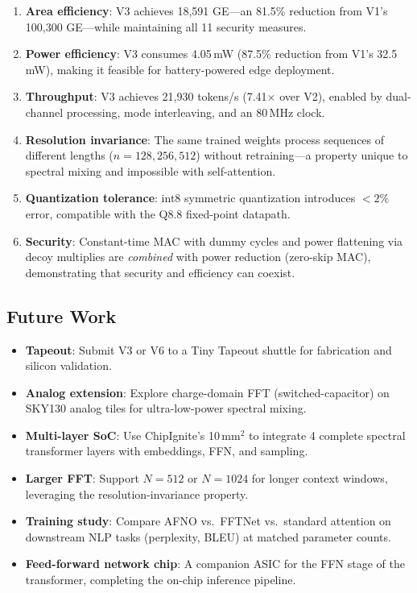 \documentclass[11pt,a4paper]{article}
\theoremstyle{definition}
\theoremstyle{remark}
\begin{document}
\begin{enumerate}
  \item \textbf{Area efficiency}: V3 achieves 18{,}591 GE---an 81.5\% reduction
    from V1's 100{,}300 GE---while maintaining all 11 security measures.
  \item \textbf{Power efficiency}: V3 consumes 4.05\,mW (87.5\% reduction from
    V1's 32.5\,mW), making it feasible for battery-powered edge deployment.
  \item \textbf{Throughput}: V3 achieves 21{,}930 tokens/s (7.41$\times$ over V2),
    enabled by dual-channel processing, mode interleaving, and an 80\,MHz clock.
  \item \textbf{Resolution invariance}: The same trained weights process
    sequences of different lengths ($n=128, 256, 512$) without retraining---a
    property unique to spectral mixing and impossible with self-attention.
  \item \textbf{Quantization tolerance}: int8 symmetric quantization introduces
    $<2\%$ error, compatible with the Q8.8 fixed-point datapath.
  \item \textbf{Security}: Constant-time MAC with dummy cycles and power
    flattening via decoy multiplies are \emph{combined} with power reduction
    (zero-skip MAC), demonstrating that security and efficiency can coexist.
\end{enumerate}

\subsection{Future Work}

\begin{itemize}
  \item \textbf{Tapeout}: Submit V3 or V6 to a Tiny Tapeout shuttle for
    fabrication and silicon validation.
  \item \textbf{Analog extension}: Explore charge-domain FFT (switched-capacitor)
    on SKY130 analog tiles for ultra-low-power spectral mixing.
  \item \textbf{Multi-layer SoC}: Use ChipIgnite's 10\,mm$^2$ to integrate
    4 complete spectral transformer layers with embeddings, FFN, and sampling.
  \item \textbf{Larger FFT}: Support $N=512$ or $N=1024$ for longer context
    windows, leveraging the resolution-invariance property.
  \item \textbf{Training study}: Compare AFNO vs.\ FFTNet vs.\ standard attention
    on downstream NLP tasks (perplexity, BLEU) at matched parameter counts.
  \item \textbf{Feed-forward network chip}: A companion ASIC for the FFN stage
    of the transformer, completing the on-chip inference pipeline.
\end{itemize}
\end{document}
